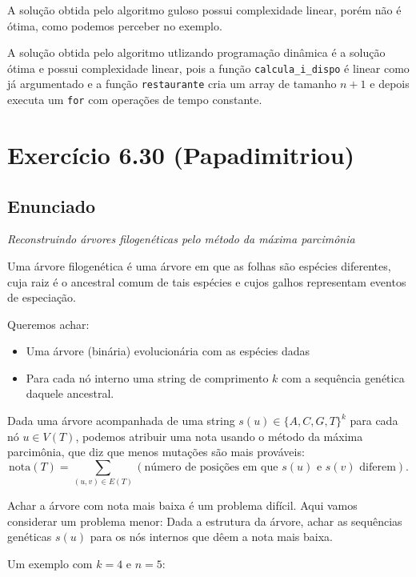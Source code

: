 \documentclass[11pt]{article}
\begin{document}
A solução obtida pelo algoritmo guloso possui complexidade linear,
porém não é ótima, como podemos perceber no exemplo.

A solução obtida pelo algoritmo utlizando programação dinâmica é a
solução ótima e possui complexidade linear, pois a função
\verb~calcula_i_dispo~ é linear como já argumentado e a função
\verb~restaurante~ cria um array de tamanho $n+1$ e depois executa um
\verb~for~ com operações de tempo constante.
\pagebreak

\section{Exercício 6.30 (Papadimitriou)}
\label{sec-4}

\subsection{Enunciado}
\label{sec-4-1}

\textit{Reconstruindo árvores filogenéticas pelo método da máxima parcimônia}

Uma árvore filogenética é uma árvore em que as folhas são espécies
diferentes, cuja raiz é o ancestral comum de tais espécies e cujos
galhos representam eventos de especiação.

Queremos achar:

\begin{itemize}
\item Uma árvore (binária) evolucionária com as espécies dadas
\item Para cada nó interno uma string de comprimento $k$ com a
sequência genética daquele ancestral.
\end{itemize}


Dada uma árvore acompanhada de uma string $s(u) \in \{A, C, G, T\}^k$ para
cada nó $u \in V(T)$, podemos atribuir uma nota usando o método da
máxima parcimônia, que diz que menos mutações são mais prováveis:
\[ \mathrm{nota}(T) = \sum_{(u,v) \in E(T)} (\text{número de posições em que }s(u)\text{ e }s(v)\text{ diferem}). \]

Achar a árvore com nota mais baixa é um problema difícil. Aqui vamos
considerar um problema menor: Dada a estrutura da árvore, achar as
sequências genéticas $s(u)$ para os nós internos que dêem a nota mais
baixa.

Um exemplo com $k = 4$ e $n = 5$:
\end{document}

